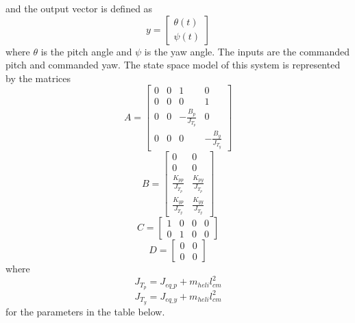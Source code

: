 \documentclass[12pt,letterpaper,onecolumn]{report}
\begin{document}
and the output vector is defined as 
$$y=\begin{bmatrix}
\theta(t)\\\psi(t)
\end{bmatrix}$$
where $\theta$ is the pitch angle and $\psi$ is the yaw angle. The inputs are the commanded pitch and commanded yaw.  The state space model of this system is represented by the matrices
$$A = \begin{bmatrix}
0 & 0 & 1 & 0 \\ 0 & 0 & 0 & 1 \\ 0 & 0 & -\frac{B_p}{J_{T_p}} & 0 \\ 0 & 0 & 0 & -\frac{B_y}{J_{T_y}}
\end{bmatrix}$$
$$B = \begin{bmatrix}
0 & 0 \\ 0 & 0 \\ \frac{K_{pp}}{J_{T_p}} & \frac{K_{py}}{J_{T_p}} \\ \frac{K_{yp}}{J_{T_y}} & \frac{K_{yy}}{J_{T_y}}
\end{bmatrix}$$
$$C = \begin{bmatrix}
1 & 0 & 0 & 0 \\ 0 & 1 & 0 & 0
\end{bmatrix}$$
$$D = \begin{bmatrix}
0 & 0 \\ 0 & 0
\end{bmatrix}$$
where 
$$J_{T_p}=J_{eq\_p}+m_{heli}l_{cm}^2$$
$$J_{T_y}=J_{eq\_y}+m_{heli}l_{cm}^2$$
for the parameters in the table below.\\
\end{document}
